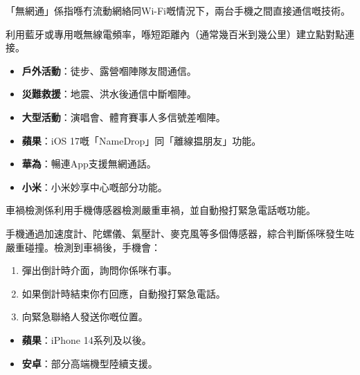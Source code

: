 
「無網通」係指喺冇流動網絡同Wi-Fi嘅情況下，兩台手機之間直接通信嘅技術。


利用藍牙或專用嘅無線電頻率，喺短距離內（通常幾百米到幾公里）建立點對點連接。


\begin{itemize}
  \item \textbf{戶外活動}：徒步、露營嗰陣隊友間通信。
  \item \textbf{災難救援}：地震、洪水後通信中斷嗰陣。
  \item \textbf{大型活動}：演唱會、體育賽事人多信號差嗰陣。
\end{itemize}


\begin{itemize}
  \item \textbf{蘋果}：iOS 17嘅「NameDrop」同「離線揾朋友」功能。
  \item \textbf{華為}：暢連App支援無網通話。
  \item \textbf{小米}：小米妙享中心嘅部分功能。
\end{itemize}


車禍檢測係利用手機傳感器檢測嚴重車禍，並自動撥打緊急電話嘅功能。


手機通過加速度計、陀螺儀、氣壓計、麥克風等多個傳感器，綜合判斷係咪發生咗嚴重碰撞。檢測到車禍後，手機會：

\begin{enumerate}
  \item 彈出倒計時介面，詢問你係咪冇事。
  \item 如果倒計時結束你冇回應，自動撥打緊急電話。
  \item 向緊急聯絡人發送你嘅位置。
\end{enumerate}


\begin{itemize}
  \item \textbf{蘋果}：iPhone 14系列及以後。
  \item \textbf{安卓}：部分高端機型陸續支援。
\end{itemize}


